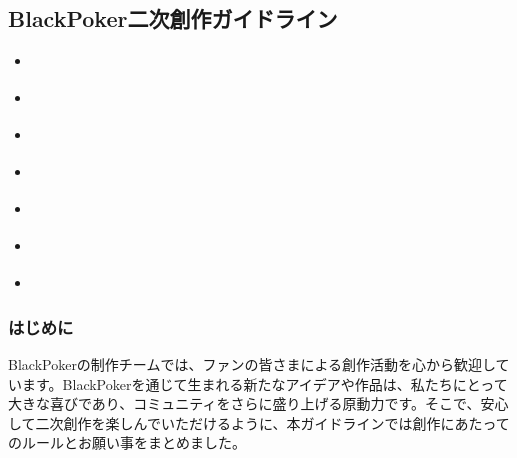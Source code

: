 \documentclass[letterpaper,10pt,dvipdfmx]{sphinxmanual}
\begin{document}
\subsection{BlackPoker二次創作ガイドライン}
\label{\detokenize{appendix/guideline/fanworks:blackpoker}}\label{\detokenize{appendix/guideline/fanworks::doc}}
\begin{sphinxShadowBox}
\begin{itemize}
\item {} 
\sphinxAtStartPar
{}\label{\detokenize{appendix/guideline/fanworks:id9}}{\hyperref[\detokenize{appendix/guideline/fanworks:id2}]{}}

\item {} 
\sphinxAtStartPar
{}\label{\detokenize{appendix/guideline/fanworks:id10}}{\hyperref[\detokenize{appendix/guideline/fanworks:id3}]{}}

\item {} 
\sphinxAtStartPar
{}\label{\detokenize{appendix/guideline/fanworks:id11}}{\hyperref[\detokenize{appendix/guideline/fanworks:id4}]{}}

\item {} 
\sphinxAtStartPar
{}\label{\detokenize{appendix/guideline/fanworks:id12}}{\hyperref[\detokenize{appendix/guideline/fanworks:id5}]{}}

\item {} 
\sphinxAtStartPar
{}\label{\detokenize{appendix/guideline/fanworks:id13}}{\hyperref[\detokenize{appendix/guideline/fanworks:id6}]{}}

\item {} 
\sphinxAtStartPar
{}\label{\detokenize{appendix/guideline/fanworks:id14}}{\hyperref[\detokenize{appendix/guideline/fanworks:id7}]{}}

\item {} 
\sphinxAtStartPar
{}\label{\detokenize{appendix/guideline/fanworks:id15}}{\hyperref[\detokenize{appendix/guideline/fanworks:id8}]{}}

\end{itemize}
\end{sphinxShadowBox}


\subsubsection{はじめに}
\label{\detokenize{appendix/guideline/fanworks:id2}}
\sphinxAtStartPar
BlackPokerの制作チームでは、ファンの皆さまによる創作活動を心から歓迎しています。BlackPokerを通じて生まれる新たなアイデアや作品は、私たちにとって大きな喜びであり、コミュニティをさらに盛り上げる原動力です。そこで、安心して二次創作を楽しんでいただけるように、本ガイドラインでは創作にあたってのルールとお願い事をまとめました。
\end{document}
